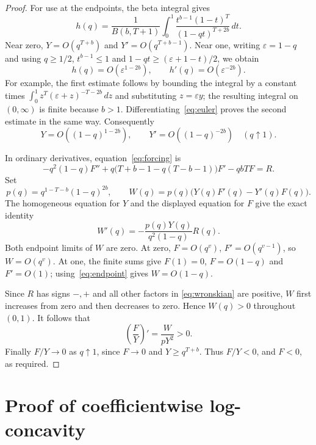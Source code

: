 \documentclass[11pt]{article}
\newcommand{\dd}{\,d}
\begin{document}
\begin{proof}
For use at the endpoints, the beta integral gives
\begin{equation}
 h(q)=\frac1{B(b,T+1)}
 \int_0^1\frac{t^{b-1}(1-t)^T}{(1-qt)^{T+2b}}\dd t .
 \label{eq:euler}
\end{equation}
Near zero, $Y=O(q^{T+b})$ and $Y'=O(q^{T+b-1})$.
Near one, writing $\varepsilon=1-q$ and using $q\geq1/2$,
$t^{b-1}\leq1$ and $1-qt\geq(\varepsilon+1-t)/2$, we obtain
\[
 h(q)=O(\varepsilon^{1-2b}),\qquad
 h'(q)=O(\varepsilon^{-2b}).
\]
For example, the first estimate follows by bounding the integral by
a constant times
$\int_0^1 z^T(\varepsilon+z)^{-T-2b}\dd z$
and substituting $z=\varepsilon y$; the resulting integral on
$(0,\infty)$ is finite because $b>1$.
Differentiating~\eqref{eq:euler} proves the second estimate in the same
way. Consequently
\begin{equation}
 Y=O((1-q)^{1-2b}),\qquad
 Y'=O((1-q)^{-2b}) \quad(q\uparrow1).
 \label{eq:endpoint}
\end{equation}

In ordinary derivatives, equation~\eqref{eq:forcing} is
\[
 -q^2(1-q)F''
 +q\bigl(T+b-1-q(T-b-1)\bigr)F'
 -qbTF=R.
\]
Set
\[
 p(q)=q^{1-T-b}(1-q)^{2b},\qquad
 W(q)=p(q)\bigl(Y(q)F'(q)-Y'(q)F(q)\bigr).
\]
The homogeneous equation for $Y$ and the displayed equation for $F$
give the exact identity
\begin{equation}
 W'(q)=-\frac{p(q)Y(q)}{q^2(1-q)}R(q).
 \label{eq:wronskian}
\end{equation}
Both endpoint limits of $W$ are zero. At zero,
$F=O(q^v)$, $F'=O(q^{v-1})$, so $W=O(q^v)$.
At one, the finite sums give $F(1)=0$, $F=O(1-q)$ and $F'=O(1)$;
using~\eqref{eq:endpoint} gives $W=O(1-q)$.

Since $R$ has signs $-,+$ and all other factors in
\eqref{eq:wronskian} are positive, $W$ first increases from zero
and then decreases to zero. Hence $W(q)>0$ throughout $(0,1)$.
It follows that
\[
 \left(\frac F Y\right)'=\frac{W}{pY^2}>0.
\]
Finally $F/Y\to0$ as $q\uparrow1$, since $F\to0$ and
$Y\geq q^{T+b}$. Thus $F/Y<0$, and $F<0$, as required.
\end{proof}

\section*{Proof of coefficientwise log-concavity}
\end{document}
